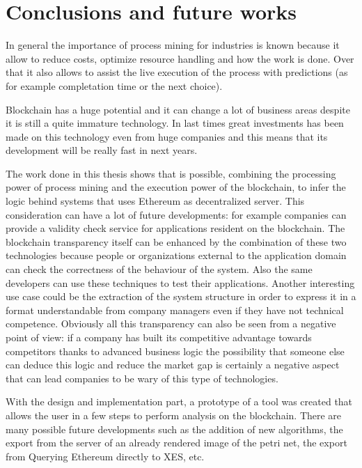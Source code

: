 \chapter{Conclusions and future works}

In general the importance of process mining for industries is known because  it allow to reduce costs, optimize resource 
handling and how the work is done. Over that it also allows to assist the live execution of the process with predictions 
(as for example completation time or the next choice).

Blockchain has a huge potential and it can change a lot of business areas despite it is still a quite immature technology. 
In last times great investments has been made on this technology even from huge companies  and this means that its 
development will be really fast in next years.

The work done in this thesis shows that is possible, combining the processing power of process mining and the execution power 
of the blockchain, to infer the logic behind systems that uses Ethereum as decentralized server. This consideration can have a 
lot of future developments: for example companies can provide a validity check service for applications resident on the 
blockchain. The blockchain transparency itself can be enhanced by the combination of these two technologies because people or 
organizations external to the application domain can check the correctness of the behaviour of the system. Also the same 
developers can use these techniques to test their applications. Another interesting use case could be the extraction of the 
system structure in order to express it in a format understandable from company managers even if they have not technical 
competence. Obviously all this transparency can also be seen from a negative point of view: if a company has built its 
competitive advantage towards competitors thanks to advanced business logic the possibility that someone else can deduce this 
logic and reduce the market gap is certainly a negative aspect that can lead companies to be wary of this type of technologies.

With the design and implementation part, a prototype of a tool was created that allows the user in a few steps to perform 
analysis on the blockchain. There are many possible future developments such as the addition of new algorithms, the export 
from the server of an already rendered image of the petri net, the export from Querying Ethereum directly to XES, etc.
